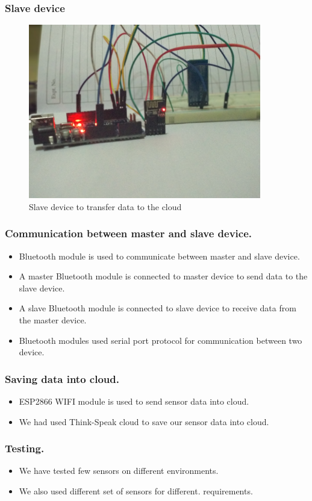 \documentclass{beamer}
\begin{document}
\begin{frame}\frametitle{Slave  device}
\begin{itemize}
  \begin{figure}[H]
  \centerline{\includegraphics[width=4.0in]{slave22}}
  \caption{ \textbf{}Slave device to transfer data to the cloud}
  \end{figure}
\end{itemize}
\end{frame}
\begin{frame}\frametitle{Communication between master and slave device.}
\begin{itemize}
\item Bluetooth module is used to communicate between master and slave device.
\item A master Bluetooth module is connected to master device to send data to the slave device. 
\item A slave Bluetooth module is connected to slave device to receive data from the master device.
\item Bluetooth modules used serial port protocol for communication between two device.
\end{itemize}
\end{frame}
\begin{frame}\frametitle{Saving data into cloud.}
\begin{itemize}
\item ESP2866 WIFI module is used to send sensor data into cloud. 
\item We had used Think-Speak cloud to save our sensor data into cloud.
\end{itemize}
\end{frame}
\begin{frame}\frametitle{Testing.}
\begin{itemize}
\item We have tested few sensors on different environments.
\item We also used different set of sensors for different. requirements.  
\end{itemize}
\end{frame}
\end{document}
